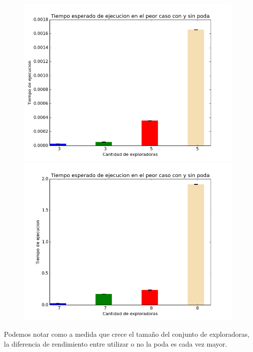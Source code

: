 \documentclass[11pt]{article}
\begin{document}
      \begin{figure}[h]
        \includegraphics[scale=0.4]{tiempoE3P}
        \includegraphics[scale=0.4]{tiempoE7P}
      \end{figure}

Podemos notar como a medida que crece el tamaño del conjunto de exploradoras, la diferencia de rendimiento entre utilizar o no la poda 
es cada vez mayor.
\end{document}
